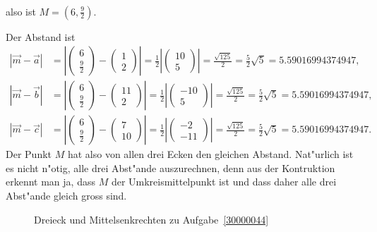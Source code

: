\begin{loesung}
\begin{teilaufgaben}
\begin{align*}
\end{align*}
also ist $M=(6,\frac92)$.
%
%
\item
Der Abstand ist
\begin{align*}
|\vec{m}-\vec{a}|
&=
\left|\begin{pmatrix}6\\\frac92\end{pmatrix}-\begin{pmatrix}1\\2\end{pmatrix}\right|
=
\frac12\left|\begin{pmatrix}10\\5\end{pmatrix}\right|
=
\frac{\sqrt{125}}2=\frac52\sqrt{5}
= 5.59016994374947,
\\
|\vec{m}-\vec{b}|
&=
\left|\begin{pmatrix}6\\\frac92\end{pmatrix}-\begin{pmatrix}11\\2\end{pmatrix}\right|
=
\frac12\left|\begin{pmatrix}-10\\5\end{pmatrix}\right|
=
\frac{\sqrt{125}}2=\frac52\sqrt{5}
= 5.59016994374947,
\\
|\vec{m}-\vec{c}|
&=
\left|\begin{pmatrix}6\\\frac92\end{pmatrix}-\begin{pmatrix}7\\10\end{pmatrix}\right|
=
\frac12\left|\begin{pmatrix}-2\\-11\end{pmatrix}\right|
=
\frac{\sqrt{125}}2=\frac52\sqrt{5}
= 5.59016994374947.
\end{align*}
Der Punkt $M$ hat also von allen drei Ecken den gleichen Abstand.
Nat"urlich ist es nicht n"otig, alle drei Abst"ande auszurechnen, denn
aus der Kontruktion erkennt man ja, dass $M$ der Umkreismittelpunkt ist
und dass daher alle drei Abst"ande gleich gross sind.
\end{teilaufgaben}
\begin{figure}
\centering
{}
\caption{Dreieck und Mittelsenkrechten zu Aufgabe~\ref{30000044}
\label{30000044:dreieck}}
\end{figure}
\end{loesung}

